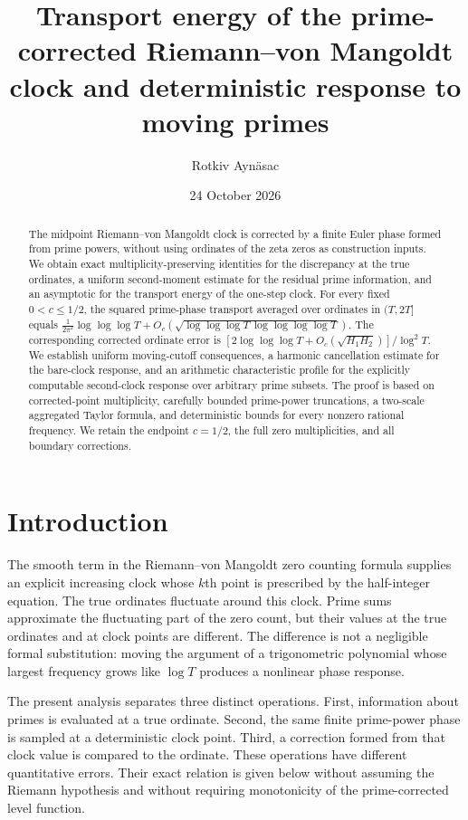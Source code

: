 \documentclass[11pt,reqno]{amsart}
\title[Transport energy of the corrected clock]{Transport energy of the prime-corrected Riemann--von Mangoldt clock and deterministic response to moving primes}
\author{Rotkiv Ayn\"asac}
\date{24 October 2026}
\numberwithin{equation}{section}
\begin{document}
\begin{abstract}
The midpoint Riemann--von Mangoldt clock is corrected by a finite Euler phase formed from prime powers, without using ordinates of the zeta zeros as construction inputs. We obtain exact multiplicity-preserving identities for the discrepancy at the true ordinates, a uniform second-moment estimate for the residual prime information, and an asymptotic for the transport energy of the one-step clock. For every fixed $0<c\le1/2$, the squared prime-phase transport averaged over ordinates in $(T,2T]$ equals $\frac1{2\pi^2}\log\log\log T+O_c(\sqrt{\log\log\log T\,\log\log\log\log T})$. The corresponding corrected ordinate error is $[2\log\log\log T+O_c(\sqrt{H_1H_2})]/\log^2T$. We establish uniform moving-cutoff consequences, a harmonic cancellation estimate for the bare-clock response, and an arithmetic characteristic profile for the explicitly computable second-clock response over arbitrary prime subsets. The proof is based on corrected-point multiplicity, carefully bounded prime-power truncations, a two-scale aggregated Taylor formula, and deterministic bounds for every nonzero rational frequency. We retain the endpoint $c=1/2$, the full zero multiplicities, and all boundary corrections.
\end{abstract}
\maketitle
\tableofcontents
\section{Introduction}
The smooth term in the Riemann--von Mangoldt zero counting formula supplies an explicit increasing clock whose $k$th point is prescribed by the half-integer equation. The true ordinates fluctuate around this clock. Prime sums approximate the fluctuating part of the zero count, but their values at the true ordinates and at clock points are different. The difference is not a negligible formal substitution: moving the argument of a trigonometric polynomial whose largest frequency grows like $\log T$ produces a nonlinear phase response.

The present analysis separates three distinct operations. First, information about primes is evaluated at a true ordinate. Second, the same finite prime-power phase is sampled at a deterministic clock point. Third, a correction formed from that clock value is compared to the ordinate. These operations have different quantitative errors. Their exact relation is given below without assuming the Riemann hypothesis and without requiring monotonicity of the prime-corrected level function.
\end{document}
